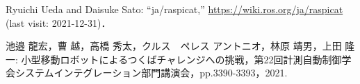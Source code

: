 \documentclass[twocolumn,9pt]{jsproceedings}
\begin{document}
\begin{thebibliography}{99}
  Ryuichi Ueda and Daisuke Sato: ``ja/raspicat,'' \url{https://wiki.ros.org/ja/raspicat} (last visit: 2021-12-31)．
  

 池邉 龍宏，曹 越，高橋 秀太，クルス　ペレス アントニオ，林原 靖男，上田 隆一: 小型移動ロボットによるつくばチャレンジへの挑戦，第22回計測自動制御学会システムインテグレーション部門講演会，pp.3390-3393，2021.






  
  
  
  

\end{thebibliography}
\normalsize
\end{document}
